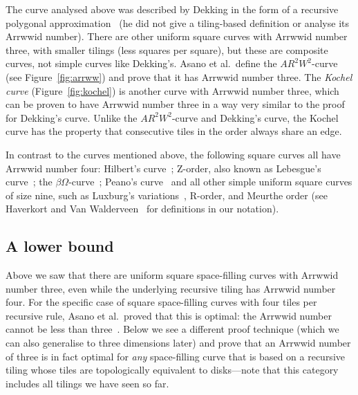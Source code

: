 \documentclass[11pt,a4paper]{article}
\newcommand{\ARRWW}{$AR^2W^2$\xspace}
\begin{document}
The curve analysed above was described by Dekking in the form of a recursive polygonal approximation~\cite{Dekking1982} (he did not give a tiling-based definition or analyse its Arrwwid number). There are other uniform square curves with Arrwwid number three, with smaller tilings (less squares per square), but these are composite curves, not simple curves like Dekking's. Asano et al.\ define the \ARRWW-curve~\cite{Asano1997} (see Figure~\ref{fig:arrww}) and prove that it has Arrwwid number three. The \emph{Kochel curve} (Figure~\ref{fig:kochel}) is another curve with Arrwwid number three, which can be proven to have Arrwwid number three in a way very similar to the proof for Dekking's curve. Unlike the \ARRWW-curve and Dekking's curve, the Kochel curve has the property that consecutive tiles in the order always share an edge.


\enlargethispage\baselineskip
In contrast to the curves mentioned above, the following square curves all have Arrwwid number four: Hilbert's curve~\cite{Hilbert1891}; Z-order, also known as Lebesgue's curve~\cite{Lebesgue1904}; the $\beta\Omega$-curve~\cite{Wierum2002}; Peano's curve~\cite{Peano1890} and all other simple uniform square curves of size nine, such as Luxburg's variations~\cite{Luxburg1998}, R-order, and Meurthe order (see Haverkort and Van Walderveen~\cite{Haverkort2009} for definitions in our notation).

\subsection{A lower bound}
Above we saw that there are uniform square space-filling curves with Arrwwid number three, even while the underlying recursive tiling has Arrwwid number four. For the specific case of square space-filling curves with four tiles per recursive rule, Asano et al.\ proved that this is optimal: the Arrwwid number cannot be less than three~\cite{Asano1997}. Below we see a different proof technique (which we can also generalise to three dimensions later) and prove that an Arrwwid number of three is in fact optimal for \emph{any} space-filling curve that is based on a recursive tiling whose tiles are topologically equivalent to disks---note that this category includes all tilings we have seen so far.
\end{document}
